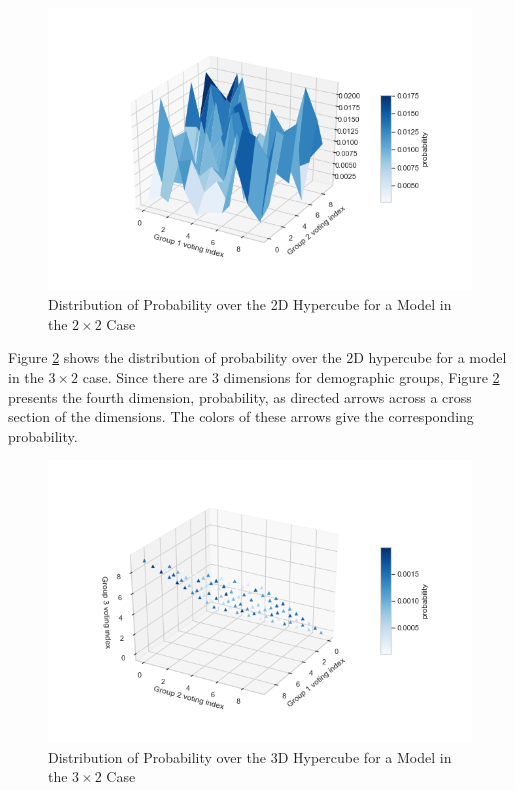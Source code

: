 \begin{figure}[ht]\centering
 \includegraphics[width=\linewidth]{figures/2d_viz.png}
 \caption{Distribution of Probability over the 2D Hypercube for a Model in the $2 \times 2$ Case}
 \label{fig:2d_viz}
\end{figure}

Figure \ref{fig:3d_viz} shows the distribution of probability over the $2$D hypercube for a model in the $3 \times 2$ case. Since there are $3$ dimensions for demographic groups, Figure \ref{fig:3d_viz} presents the fourth dimension, probability, as directed arrows across a cross section of the dimensions. The colors of these arrows give the corresponding probability.

\begin{figure}[ht]\centering
 \includegraphics[width=\linewidth]{figures/3d_viz.png}
 \caption{Distribution of Probability over the 3D Hypercube for a Model in the $3 \times 2$ Case}
 \label{fig:3d_viz}
\end{figure}
